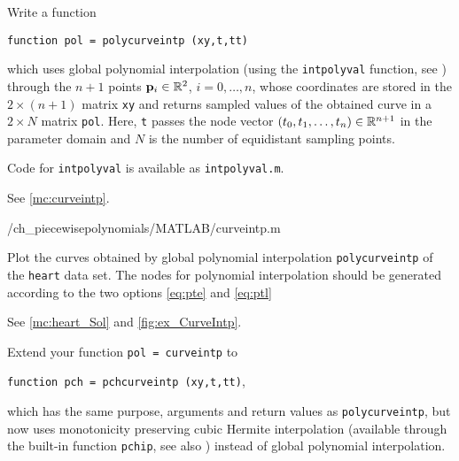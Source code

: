 \begin{problem}

\begin{subproblem}[3] \label{subprb:CurveInterp_1}
Write a \Matlab{} function
%
\begin{center}
\texttt{function \quad pol = polycurveintp (xy,t,tt)}
\end{center}
%
which uses global polynomial interpolation (using the \texttt{intpolyval}
function, see ) through the $n+1$ points
${\mathbf{p}}_{i}\in\mathbb{R}^{2}$, $i=0,\ldots,n$, whose coordinates are stored in the $2
\times (n+1)$ matrix \texttt{xy} and returns sampled values of the obtained curve
in a $2 \times N$ matrix \texttt{pol}.  Here, \texttt{t} passes the node vector
$(t_{0},t_{1},\ldots,t_{n})\in\mathbb{R}^{n+1}$ in the parameter domain and $N$ is the
number of equidistant sampling points.

\hint{} Code for \texttt{intpolyval} is available as \texttt{intpolyval.m}.

\begin{solution}
See \autoref{mc:curveintp}.

{\problems/ch_piecewisepolynomials/MATLAB/curveintp.m}
\end{solution}
\end{subproblem}


\begin{subproblem}[1] \label{subprb:CurveInterp_2}
Plot the curves obtained by global polynomial interpolation \texttt{polycurveintp}
of the \texttt{heart} data set. The nodes for polynomial interpolation should be
generated according to the two options \eqref{eq:pte} and \eqref{eq:ptl}

\begin{solution}
See \autoref{mc:heart_Sol} and \autoref{fig:ex_CurveIntp}.
\end{solution}
\end{subproblem}


\begin{subproblem}[3] \label{subprb:CurveInterp_3}
Extend your \Matlab{} function \texttt{pol = curveintp} to
%
\begin{center}
\texttt{function \quad pch = pchcurveintp (xy,t,tt)},
\end{center}
%
which has the same purpose, arguments and return values as \texttt{polycurveintp}, but now
uses monotonicity preserving cubic Hermite interpolation  (available through the
\Matlab{} built-in function \texttt{pchip}, see also ) instead of global 
polynomial interpolation. 


\end{subproblem}
\end{problem}
